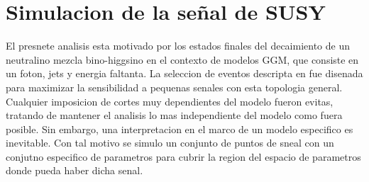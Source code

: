 \section{Simulacion de la se\~nal de SUSY}
\label{sec:sig_samples}

El presnete analisis esta motivado por los estados finales del decaimiento de un
neutralino mezcla bino-higgsino en el contexto de modelos GGM, que consiste en
un foton, jets y energia faltanta. La seleccion de eventos descripta en {\XXX}
fue disenada para maximizar la sensibilidad a pequenas senales con esta
topologia general. Cualquier imposicion de cortes muy dependientes del modelo
fueron evitas, tratando de mantener el analisis lo mas independiente del modelo
como fuera posible. Sin embargo, una interpretacion en el marco de un modelo
especifico es inevitable. Con tal motivo se simulo un conjunto de puntos de
sneal con un conjutno especifico de parametros para cubrir la region del espacio
de parametros donde pueda haber dicha senal.


